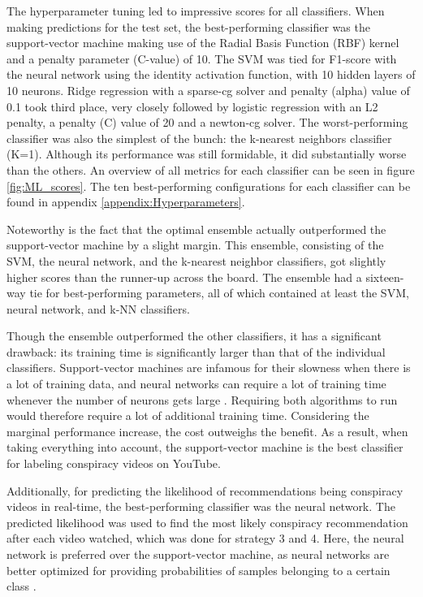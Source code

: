 \documentclass[../main.tex]{subfiles}
\begin{document}
The hyperparameter tuning led to impressive scores for all classifiers. When making predictions for the
test set, the best-performing classifier was the support-vector machine making use of the Radial Basis
Function (RBF) kernel and a penalty parameter (C-value) of 10. The SVM was tied for F1-score with the neural 
network using the identity activation function, with 10 hidden layers of 10 neurons. Ridge regression with a 
sparse-cg solver and penalty (alpha) value of 0.1 took third place, very closely followed by logistic 
regression with an L2 penalty, a penalty (C) value of 20 and a newton-cg solver. The worst-performing 
classifier was also the simplest of the bunch: the k-nearest neighbors classifier (K=1). Although its 
performance was still formidable, it did substantially worse than the others. An overview of all metrics for 
each classifier can be seen in figure \ref{fig:ML_scores}. The ten best-performing configurations for each
classifier can be found in appendix \ref{appendix:Hyperparameters}.

Noteworthy is the fact that the optimal ensemble actually outperformed the support-vector machine by a
slight margin. This ensemble, consisting of the SVM, the neural network, and the k-nearest
neighbor classifiers, got slightly higher scores than the runner-up across the board. The ensemble had
a sixteen-way tie for best-performing parameters, all of which contained at least the SVM, neural network,
and k-NN classifiers. 

Though the ensemble outperformed the other classifiers, it has a significant drawback: its training time
is significantly larger than that of the individual classifiers. Support-vector machines are infamous
for their slowness when there is a lot of training data, and neural networks can require a lot of
training time whenever the number of neurons gets large \citep{burges1997improving,
kamarthi1999accelerating}. Requiring both algorithms to run would therefore require a lot of additional
training time. Considering the marginal performance increase, the cost outweighs the benefit. As a
result, when taking everything into account, the support-vector machine is the best classifier for
labeling conspiracy videos on YouTube.

Additionally, for predicting the likelihood of recommendations being conspiracy videos in real-time, the 
best-performing classifier was the neural network. The predicted likelihood was used to find the most likely 
conspiracy recommendation after each video watched, which was done for strategy 3 and 4. Here, the neural 
network is preferred over the support-vector machine, as neural networks are better optimized for providing 
probabilities of samples belonging to a certain class \citep{specht1990probabilistic}.
\end{document}
